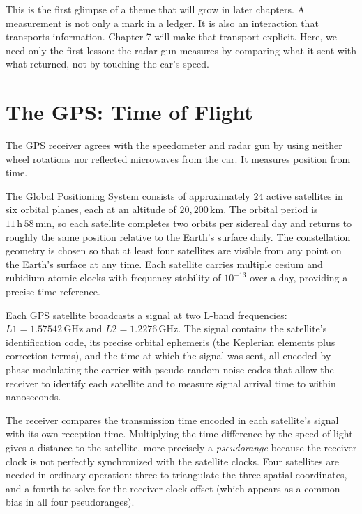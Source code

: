 This is the first glimpse of a theme that will grow in later chapters. A
measurement is not only a mark in a ledger. It is also an interaction that
transports information. Chapter 7 will make that transport explicit. Here, we
need only the first lesson: the radar gun measures by comparing what it sent
with what returned, not by touching the car's speed.

\section{The GPS: Time of Flight}
\label{se:the-gps-time-of-flight}

The GPS receiver agrees with the speedometer and radar gun by using neither
wheel rotations nor reflected microwaves from the car. It measures position
from time.

The Global Positioning System consists of approximately $24$ active
satellites in six orbital planes, each at an altitude of $20{,}200\,\mathrm{km}$.
The orbital period is $11\,\mathrm{h}\,58\,\mathrm{min}$, so each satellite
completes two orbits per sidereal day and returns to roughly the same
position relative to the Earth's surface daily. The constellation geometry
is chosen so that at least four satellites are visible from any point on
the Earth's surface at any time. Each satellite carries multiple cesium and
rubidium atomic clocks with frequency stability of $10^{-13}$ over a day,
providing a precise time reference.

Each GPS satellite broadcasts a signal at two L-band frequencies:
$L1 = 1{.}57542\,\mathrm{GHz}$ and $L2 = 1{.}2276\,\mathrm{GHz}$. The
signal contains the satellite's identification code, its precise orbital
ephemeris (the Keplerian elements plus correction terms), and the time at
which the signal was sent, all encoded by phase-modulating the carrier
with pseudo-random noise codes that allow the receiver to identify each
satellite and to measure signal arrival time to within nanoseconds.

The receiver compares the transmission time encoded in each satellite's
signal with its own reception time. Multiplying the time difference by
the speed of light gives a distance to the satellite, more precisely a
\emph{pseudorange} because the receiver clock is not perfectly
synchronized with the satellite clocks. Four satellites are needed in
ordinary operation: three to triangulate the three spatial coordinates,
and a fourth to solve for the receiver clock offset (which appears as a
common bias in all four pseudoranges).

